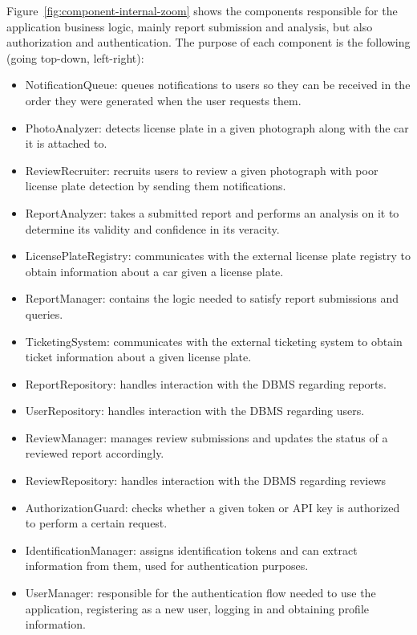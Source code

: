 Figure~\ref{fig:component-internal-zoom} shows the components responsible for the application business logic, mainly report submission and analysis, but also authorization and authentication.
The purpose of each component is the following (going top-down, left-right):
\begin{itemize}
    \item NotificationQueue: queues notifications to users so they can be received in the order they were generated when the user requests them.
    \item PhotoAnalyzer: detects license plate in a given photograph along with the car it is attached to.
    \item ReviewRecruiter: recruits users to review a given photograph with poor license plate detection by sending them notifications.
    \item ReportAnalyzer: takes a submitted report and performs an analysis on it to determine its validity and confidence in its veracity. 
    \item LicensePlateRegistry: communicates with the external license plate registry to obtain information about a car given a license plate.
    \item ReportManager: contains the logic needed to satisfy report submissions and queries.
    \item TicketingSystem: communicates with the external ticketing system to obtain ticket information about a given license plate.
    \item ReportRepository: handles interaction with the DBMS regarding reports.
    \item UserRepository: handles interaction with the DBMS regarding users.
    \item ReviewManager: manages review submissions and updates the status of a reviewed report accordingly.
    \item ReviewRepository: handles interaction with the DBMS regarding reviews
    \item AuthorizationGuard: checks whether a given token or API key is authorized to perform a certain request.
    \item IdentificationManager: assigns identification tokens and can extract information from them, used for authentication purposes.
    \item UserManager: responsible for the authentication flow needed to use the application, registering as a new user, logging in and obtaining profile information.
\end{itemize}

